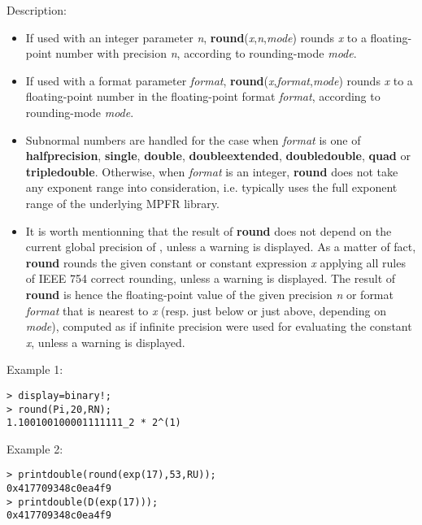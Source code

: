 \noindent Description: \begin{itemize}

\item If used with an integer parameter \emph{n}, \textbf{round}(\emph{x},\emph{n},\emph{mode}) rounds \emph{x} to a floating-point number with 
   precision \emph{n}, according to rounding-mode \emph{mode}. 

\item If used with a format parameter \emph{format}, \textbf{round}(\emph{x},\emph{format},\emph{mode}) rounds \emph{x} to a floating-point number in the 
   floating-point format \emph{format}, according to rounding-mode \emph{mode}. 

\item Subnormal numbers are handled for the case when \emph{format} is one of
   \textbf{halfprecision}, \textbf{single}, \textbf{double}, \textbf{doubleextended}, \textbf{doubledouble},
   \textbf{quad} or \textbf{tripledouble}. Otherwise, when \emph{format} is an integer,
   \textbf{round} does not take any exponent range into consideration,
   i.e. typically uses the full exponent range of the underlying MPFR
   library.

\item It is worth mentionning that the result of \textbf{round} does not depend on
   the current global precision of \sollya, unless a warning is
   displayed. As a matter of fact, \textbf{round} rounds the given constant or
   constant expression \emph{x} applying all rules of IEEE 754 correct
   rounding, unless a warning is displayed. The result of \textbf{round} is
   hence the floating-point value of the given precision \emph{n} or format
   \emph{format} that is nearest to \emph{x} (resp. just below or just above,
   depending on \emph{mode}), computed as if infinite precision were used for
   evaluating the constant \emph{x}, unless a warning is displayed.
\end{itemize}
\noindent Example 1: 
\begin{center}\begin{minipage}{15cm}\begin{Verbatim}[frame=single]
> display=binary!;
> round(Pi,20,RN);
1.100100100001111111_2 * 2^(1)
\end{Verbatim}
\end{minipage}\end{center}
\noindent Example 2: 
\begin{center}\begin{minipage}{15cm}\begin{Verbatim}[frame=single]
> printdouble(round(exp(17),53,RU));
0x417709348c0ea4f9
> printdouble(D(exp(17)));
0x417709348c0ea4f9
\end{Verbatim}
\end{minipage}\end{center}
